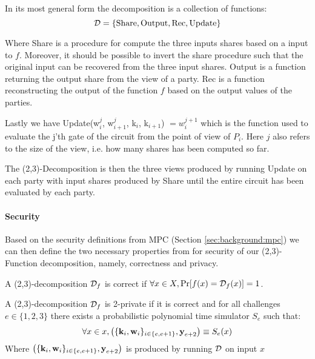 \begin{definition}
  In its most general form the decomposition is a collection of functions:
  \[
    \mathcal{D} = \{\text{Share}, \text{Output}, \text{Rec}, \text{Update}\}
  \]

  Where Share is a procedure for compute the three inputs shares based on a
  input to $f$.
  Moreover, it should be possible to invert the share procedure such that the
  original input can be recovered from the three input shares.
  Output is a function returning the output share from the view of a party.
  Rec is a function reconstructing the output of the function $f$ based on the
  output values of the parties.

  Lastly we have Update(w$^{j}_{i}$, w$^{j}_{i+1}$, k$_{i}$, k$_{i+1}$) $= w^{j+1}_{i}$ which
  is the function used to evaluate the j'th gate of the circuit from the point
  of view of $P_{i}$. Here
  $j$ also refers to the size of the view, i.e. how many shares has been
  computed so far.
\end{definition}

The (2,3)-Decomposition is then the three views produced by running Update on
each party with input shares produced by Share until the entire circuit has been
evaluated by each party.

\paragraph{Security}
Based on the security definitions from MPC (Section \ref{sec:background:mpc}) we
can then define the two necessary properties from \cite{zkboo} for security of
our (2,3)-Function decomposition, namely, correctness and privacy.

\begin{definition}[Correctness]
\label{def:decomp_correctness}
A (2,3)-decomposition $\mathcal{D}_{f}$ is correct if
$\forall x \in X, \operatorname{Pr}[f(x) = \mathcal{D}_{f}(x)] = 1$.
\end{definition}

\begin{definition}[Privacy]
\label{def:decomp_privacy}
A (2,3)-decomposition $\mathcal{D}_{f}$ is 2-private if it is correct and for all challenges
$e \in \{1,2,3\}$ there exists a probabilistic polynomial time simulator $S_{e}$
such that:
\[
  \forall x \in x, \left(\{\textbf{k}_{i}, \textbf{w}_{i} \}_{i \in \{e, e+1\}}, \textbf{y}_{e+2} \right)
  \equiv S_{e}(x)
\]
Where $\left(\{\textbf{k}_{i}, \textbf{w}_{i} \}_{i \in \{e, e+1\}}, \textbf{y}_{e+2}
\right)$ is produced by running $\mathcal{D}$ on input $x$
\end{definition}

